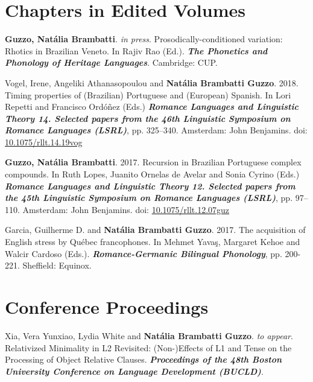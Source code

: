 \documentclass[letterpaper,10pt]{article}
\begin{document}
\vspace{0.3cm}

\section*{Chapters in Edited Volumes}

 \textbf{Guzzo, Nat\'alia Brambatti}. \emph{in press}. Prosodically-conditioned variation: Rhotics in Brazilian Veneto. In Rajiv Rao (Ed.). \textbf{\emph{The Phonetics and Phonology of Heritage Languages}}. Cambridge: CUP.

 Vogel, Irene, Angeliki Athanasopoulou and \textbf{Nat\'alia Brambatti Guzzo}. 2018. Timing properties of (Brazilian) Portuguese and (European) Spanish. In Lori Repetti and Francisco Ord\'o\~nez (Eds.) \textbf{\textit{Romance Languages and Linguistic Theory 14. Selected papers from the 46th Linguistic Symposium on Romance Languages (LSRL)}}, pp. 325--340. Amsterdam: John Benjamins. doi: \href{https://doi.org/10.1075/rllt.14.19vog}{10.1075/rllt.14.19vog}

 \textbf{Guzzo, Nat\'alia Brambatti}. 2017. Recursion in Brazilian Portuguese complex compounds. In Ruth Lopes, Juanito Ornelas de Avelar and Sonia Cyrino (Eds.) \textbf{\textit{Romance Languages and Linguistic Theory 12. Selected papers from the 45th Linguistic Symposium on Romance Languages (LSRL)}}, pp. 97--110. Amsterdam: John Benjamins. doi: \href{https://doi.org/10.1075/rllt.12.07guz}{10.1075/rllt.12.07guz}

 Garcia, Guilherme D. and \textbf{Nat\'alia Brambatti Guzzo}. 2017. The acquisition of English stress by Qu\'ebec francophones. In Mehmet Yava\c{s}, Margaret Kehoe and Walcir Cardoso (Eds.). \textbf{\textit{Romance-Germanic Bilingual Phonology}}, pp. 200-221. Sheffield: Equinox.




\vspace{0.3cm}

\section*{Conference Proceedings}

 Xia, Vera Yunxiao, Lydia White and \textbf{Nat\'alia Brambatti Guzzo}. \emph{to appear}. Relativized Minimality in L2 Revisited: (Non-)Effects of L1 and Tense on the Processing of Object Relative Clauses. \textbf{\emph{Proceedings of the 48th Boston University Conference on Language Development (BUCLD)}}.
\end{document}

